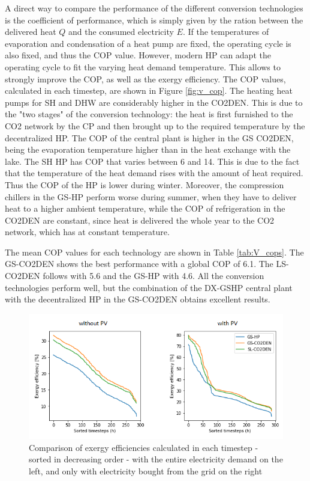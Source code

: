 \documentclass{article}
\begin{document}
A direct way to compare the performance of the different conversion technologies is the coefficient of performance, which is simply given by the ration between the delivered heat $Q$ and the consumed electricity $E$. If the temperatures of evaporation and condensation of a heat pump are fixed, the operating cycle is also fixed, and thus the COP value. However, modern HP can adapt the operating cycle to fit the varying heat demand temperature. This allows to strongly improve the COP, as well as the exergy efficiency. The COP values, calculated in each timestep, are shown in Figure \ref{fig:v_cop}. 
The heating heat pumps for SH and DHW are considerably higher in the CO2DEN. This is due to the "two stages" of the conversion technology: the heat is first furnished to the CO2 network by the CP and then brought up to the required temperature by the decentralized HP. 
The COP of the central plant is higher in the GS CO2DEN, being the evaporation temperature higher than in the heat exchange with the lake. 
The SH HP has COP that varies between 6 and 14. This is due to the fact that the temperature of the heat demand rises with the amount of heat required. Thus the COP of the HP is lower during winter.
Moreover, the compression chillers in the GS-HP perform worse during summer, when they have to deliver heat to a higher ambient temperature, while the COP of refrigeration in the CO2DEN are constant, since heat is delivered the whole year to the CO2 network, which has at constant temperature.

The mean COP values for each technology are shown in Table \ref{tab:V_cops}. The GS-CO2DEN shows the best performance with a global COP of 6.1. The LS-CO2DEN follows with 5.6 and the GS-HP with 4.6. All the conversion technologies perform well, but the combination of the DX-GSHP central plant with the decentralized HP in the GS-CO2DEN obtains excellent results.



\begin{figure}[tph]
	\centering
	\includegraphics[width=0.875\linewidth]{Images/V_EXE}
	\caption{Comparison of exergy efficiencies calculated in each timestep - sorted in decreasing order - with the entire electricity demand on the left, and only with electricity bought from the grid on the right}
	\label{fig:v_exe}
\end{figure}
\end{document}
